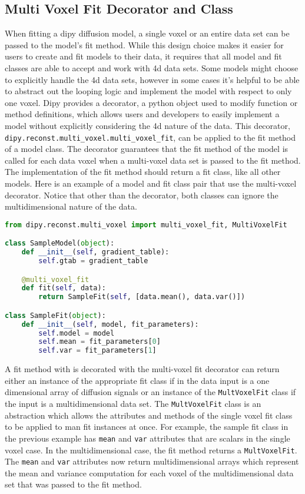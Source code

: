 \subsection{Multi Voxel Fit Decorator and Class}

When fitting a dipy diffusion model, a single voxel or an entire data set can be passed to the model's fit method. While this design choice makes it easier for users to create and fit models to their data, it requires that all model and fit classes are able to accept and work with 4d data sets. Some models might choose to explicitly handle the 4d data sets, however in some cases it's helpful to be able to abstract out the looping logic and implement the model with respect to only one voxel. Dipy provides a decorator, a python object used to modify function or method definitions, which allows users and developers to easily implement a model without explicitly considering the 4d nature of the data. This decorator, \texttt{dipy.reconst.multi_voxel.multi_voxel_fit}, can be applied to the fit method of a model class. The decorator guarantees that the fit method of the model is called for each data voxel when a multi-voxel data set is passed to the fit method. The implementation of the fit method should return a fit class, like all other models. Here is an example of a model and fit class pair that use the multi-voxel decorator. Notice that other than the decorator, both classes can ignore the multidimensional nature of the data.

\begin{lstlisting}[language=python]
from dipy.reconst.multi_voxel import multi_voxel_fit, MultiVoxelFit

class SampleModel(object):
    def __init__(self, gradient_table):
        self.gtab = gradient_table

    @multi_voxel_fit
    def fit(self, data):
        return SampleFit(self, [data.mean(), data.var()])

class SampleFit(object):
    def __init__(self, model, fit_parameters):
        self.model = model
        self.mean = fit_parameters[0]
        self.var = fit_parameters[1]
\end{lstlisting}

A fit method with is decorated with the multi-voxel fit decorator can return either an instance of the appropriate fit class if in the data input is a one dimensional array of diffusion signals or an instance of the \texttt{MultVoxelFit} class if the input is a multidimensional data set. The \texttt{MultVoxelFit} class is an abstraction which allows the attributes and methods of the single voxel fit class to be applied to man fit instances at once. For example, the sample fit class in the previous example has \texttt{mean} and \texttt{var} attributes that are scalars in the single voxel case. In the multidimensional case, the fit method returns a \texttt{MultVoxelFit}. The \texttt{mean} and \texttt{var} attributes now return multidimensional arrays which represent the mean and variance computation for each voxel of the multidimensional data set that was passed to the fit method.

